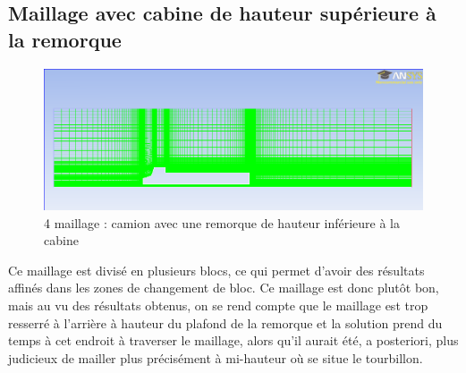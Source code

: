 \subsection{Maillage avec cabine de hauteur supérieure à la remorque}
\begin{figure}[!h]
\centering
\includegraphics[scale=0.38]{images/remorque3_mesh.png}
\caption{4\ieme{} maillage : camion avec une remorque de hauteur inférieure à la cabine}
\end{figure}
Ce maillage est divisé en plusieurs blocs, ce qui permet d'avoir des résultats affinés dans les zones de changement de bloc. Ce maillage est donc plutôt bon, mais au vu des résultats obtenus, on se rend compte que le maillage est trop resserré à l'arrière à hauteur du plafond de la remorque et la solution prend du temps à cet endroit à traverser le maillage, alors qu'il aurait été, a posteriori, plus judicieux de mailler plus précisément à mi-hauteur où se situe le tourbillon.

